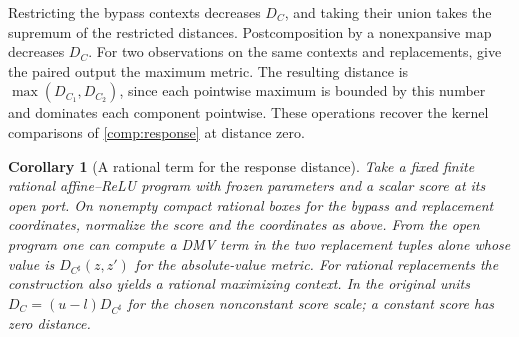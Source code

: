 \documentclass[11pt,a4paper]{article}
\newtheorem{corollary}[corollary]{Corollary}
\theoremstyle{definition}
\theoremstyle{remark}\newaliascnt{remark}{theorem}
\numberwithin{equation}{section}
\begin{document}
Restricting the bypass contexts decreases \(D_C\), and taking their union takes the supremum of the restricted distances. Postcomposition by a nonexpansive map decreases \(D_C\). For two observations on the same contexts and replacements, give the paired output the maximum metric. The resulting distance is \(\max(D_{C_1},D_{C_2})\), since each pointwise maximum is bounded by this number and dominates each component pointwise. These operations recover the kernel comparisons of \cref{comp:response} at distance zero.

\begin{corollary}[A rational term for the response distance]\label{cor:dmv-response}
Take a fixed finite rational affine--ReLU program with frozen parameters and a scalar score at its open port. On nonempty compact rational boxes for the bypass and replacement coordinates, normalize the score and the coordinates as above. From the open program one can compute a DMV term in the two replacement tuples alone whose value is \(D_{C^\sharp}(z,z')\) for the absolute-value metric. For rational replacements the construction also yields a rational maximizing context. In the original units \(D_C=(u-l)D_{C^\sharp}\) for the chosen nonconstant score scale; a constant score has zero distance.
\end{corollary}
\end{document}
